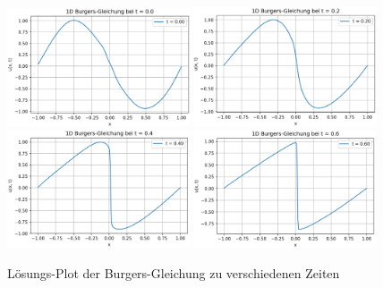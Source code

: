 \begin{figure}
    \includegraphics[width=0.48\textwidth]{papers/neuronal/images/burgers_solution_t0.png}\hfill
    \includegraphics[width=0.48\textwidth]{papers/neuronal/images/burgers_solution_t02.png}
    \\[\smallskipamount]
    \includegraphics[width=0.48\textwidth]{papers/neuronal/images/burgers_solution_t04.png}\hfill
    \includegraphics[width=0.48\textwidth]{papers/neuronal/images/burgers_solution_t06.png}
    \caption{Lösungs-Plot der Burgers-Gleichung zu verschiedenen Zeiten}\label{fig:loesung_burgers_fix_zeit}
\end{figure}
